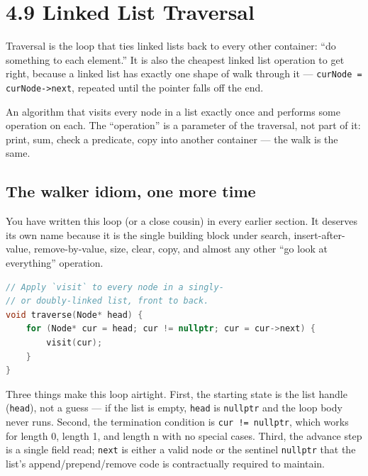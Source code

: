\documentclass[11pt]{article}
\begin{document}
\section{4.9 Linked List Traversal}

Traversal is the loop that ties linked lists back to every other
container: ``do something to each element.'' It is also the cheapest
linked list operation to get right, because a linked list has
exactly one shape of walk through it --- \texttt{curNode =
curNode->next}, repeated until the pointer falls off the end.

\begin{defnbox}[Traversal]
An algorithm that visits every node in a list exactly once and
performs some operation on each. The ``operation'' is a parameter
of the traversal, not part of it: print, sum, check a predicate,
copy into another container --- the walk is the same.
\end{defnbox}

\subsection*{The walker idiom, one more time}

You have written this loop (or a close cousin) in every earlier
section. It deserves its own name because it is the single
building block under search, insert-after-value, remove-by-value,
size, clear, copy, and almost any other ``go look at everything''
operation.

\begin{examplebox}
\begin{lstlisting}[language=C++,basicstyle=\ttfamily\small,frame=single]
// Apply `visit` to every node in a singly-
// or doubly-linked list, front to back.
void traverse(Node* head) {
    for (Node* cur = head; cur != nullptr; cur = cur->next) {
        visit(cur);
    }
}
\end{lstlisting}
\end{examplebox}

Three things make this loop airtight. First, the starting state is
the list handle (\texttt{head}), not a guess --- if the list is
empty, \texttt{head} is \texttt{nullptr} and the loop body never
runs. Second, the termination condition is \texttt{cur != nullptr},
which works for length 0, length 1, and length n with no special
cases. Third, the advance step is a single field read;
\texttt{next} is either a valid node or the sentinel
\texttt{nullptr} that the list's append/prepend/remove code is
contractually required to maintain.
\end{document}
